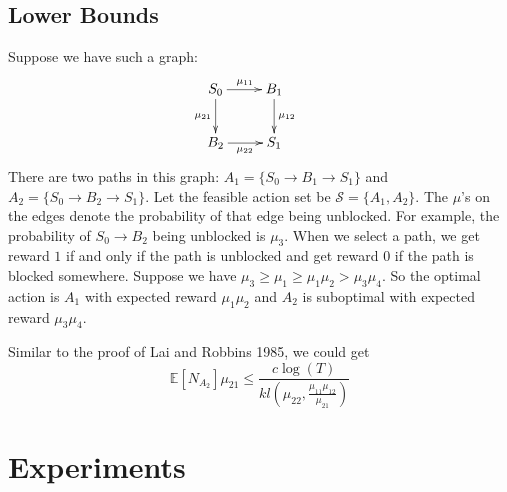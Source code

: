 \documentclass{article}
\newcommand{\EE}{\mathbb{E}}
\newcommand{\cS}{\mathcal{S}}
\begin{document}
\subsection{Lower Bounds}

Suppose we have such a graph: 
$$
  \xymatrix{
  	S_0 \ar[r]^{\mu_{11}} \ar[d]_{\mu_{21}} & B_1 \ar[d]^{\mu_{12}} &\\
  	B_2 \ar[r]_{\mu_{22}} & S_1
  }
$$
There are two paths in this graph: $A_1 = \{S_0 \to B_1 \to S_1\}$ and $A_2 = \{S_0 \to B_2 \to S_1\}$. 
Let the feasible action set be $\cS = \{A_1, A_2\}.$ The $\mu$'s on the edges denote the probability of that edge being unblocked. 
For example, the probability of $S_0 \to B_2$ being unblocked is $\mu_3$. 
When we select a path, we get reward $1$ if and only if the path is unblocked and get reward $0$ if the path is blocked somewhere. 
Suppose we have $\mu_3 \geq \mu_1 \geq \mu_1\mu_2 > \mu_3 \mu_4$.
So the optimal action is $A_1$ with expected reward $\mu_1 \mu_2$ and $A_2$ is suboptimal with expected reward $\mu_3 \mu_4$.

Similar to the proof of Lai and Robbins 1985, we could get
$$
	\EE[N_{A_2}]\mu_{21} \leq \frac{c \log(T)}{kl(\mu_{22}, \frac{\mu_{11}\mu_{12}}{\mu_{21}})}
$$


\section{Experiments}
\end{document}
